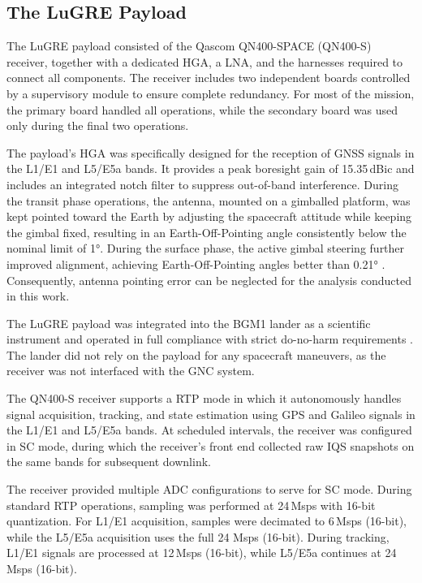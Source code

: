 \documentclass{IEEEtaes}
\begin{document}
\subsection{The LuGRE Payload}
The \gls{LuGRE} payload consisted of the Qascom QN400-SPACE (QN400-S) receiver, together with a dedicated \gls{HGA}, a \gls{LNA}, and the harnesses required to connect all components. The receiver includes two independent boards controlled by a supervisory module to ensure complete redundancy. For most of the mission, the primary board handled all operations, while the secondary board was used only during the final two operations.

The payload’s \gls{HGA} was specifically designed for the reception of \gls{GNSS} signals in the L1/E1 and L5/E5a bands. It provides a peak boresight gain of 15.35\,dBic and includes an integrated notch filter to suppress out-of-band interference. During the transit phase operations, the antenna, mounted on a gimballed platform, was kept pointed toward the Earth by adjusting the spacecraft attitude while keeping the gimbal fixed, resulting in an Earth-Off-Pointing angle consistently below the nominal limit of 1°. During the surface phase, the active gimbal steering further improved alignment, achieving Earth-Off-Pointing angles better than 0.21° \cite{JournalDiMissione}. Consequently, antenna pointing error can be neglected for the analysis conducted in this work.

The \gls{LuGRE} payload was integrated into the \gls{BGM1} lander as a scientific instrument and operated in full compliance with strict do-no-harm requirements \cite{JournalDiMissione, pulliero2023space}. The lander did not rely on the payload for any spacecraft maneuvers, as the receiver was not interfaced with the \gls{GNC} system.

The QN400-S receiver supports a \gls{RTP} mode in which it autonomously handles signal acquisition, tracking, and state estimation using \gls{GPS} and Galileo signals in the L1/E1 and L5/E5a bands. At scheduled intervals, the receiver was configured in \gls{SC} mode, during which the receiver's front end collected raw \gls{IQS} snapshots on the same bands for subsequent downlink.

The receiver provided multiple \gls{ADC} configurations to serve for \gls{SC} mode. During standard \gls{RTP} operations, sampling was performed at 24\,Msps with 16-bit quantization. For L1/E1 acquisition, samples were decimated to 6\,Msps (16-bit), while the L5/E5a acquisition uses the full 24 Msps (16-bit). During tracking, L1/E1 signals are processed at 12\,Msps (16-bit), while L5/E5a continues at 24\,Msps (16-bit).
\end{document}
